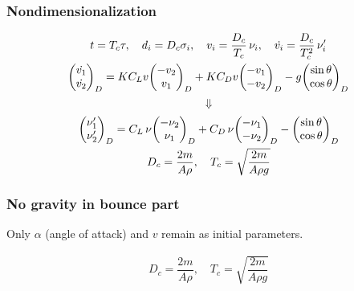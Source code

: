 \documentclass{beamer}
\begin{document}

\begin{frame}

\frametitle{Nondimensionalization}

\begin{gather}
t = T_c \tau,  \quad d_i = D_c \sigma_i, \quad v_i = \dfrac{D_c}{T_c} \, \nu_i, \quad
\dot{v_i} = \dfrac{D_c}{T_c^2} \, \nu_i'
\\
\mqty( \dot{v_1} \\ \dot{v_2}\\)_D = K  C_L v \mqty(-v_2 \\ v_1\\)_D + K C_D v \mqty(-v_1 \\ -v_2\\)_D - g  \mqty(\sin \theta \\ \cos \theta)_D
\end{gather}
$$\Downarrow$$
\begin{gather}
\mqty( \nu_1' \\ \nu_2' \\)_D = C_L  \, \nu \mqty(-\nu_2 \\ \nu_1\\)_D + C_D \, \nu \mqty(-\nu_1 \\ -\nu_2\\)_D -   \mqty(\sin \theta \\ \cos \theta)_D
\\
D_c = \dfrac{2m}{A \rho}, \quad T_c = \sqrt{\dfrac{2m}{A \rho g}}
\end{gather}

\end{frame}


\begin{frame}

\frametitle{No gravity in bounce part}
Only $\alpha$ (angle of attack) and $v$ remain as initial parameters.

\begin{gather}
D_c = \dfrac{2m}{A \rho}, \quad T_c = \sqrt{\dfrac{2m}{A \rho g}}
\end{gather}


\end{frame}

\end{document}
